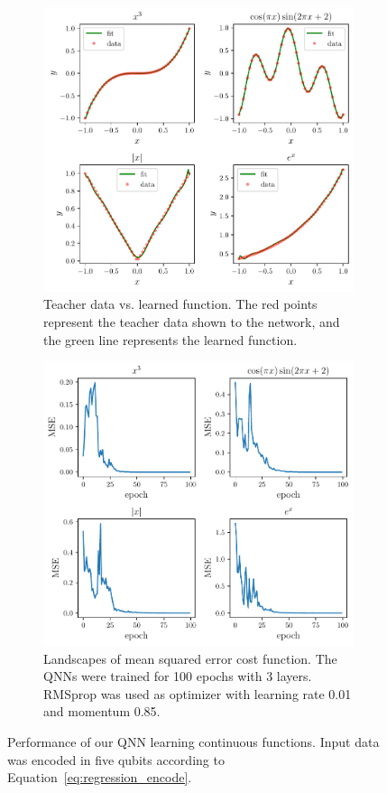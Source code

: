 \documentclass[a4paper,10pt]{article}
\begin{document}
\begin{figure}[ht]
	\centering
	\begin{subfigure}{.4875\textwidth}
		\centering
		\includegraphics[width=1\linewidth]{figures/qnn_regression.pdf}
		\caption{Teacher data vs. learned function. The red points represent the teacher data shown to the network, and the green line represents the learned function.}
	\end{subfigure}
	\hfill
	\begin{subfigure}{.4875\textwidth}
		\centering
		\includegraphics[width=1\linewidth]{figures/qnn_regression_mse.pdf}
		\caption{Landscapes of mean squared error cost function. The QNNs were trained for 100 epochs with 3 layers. RMSprop was used as optimizer with learning rate 0.01 and momentum 0.85.}
	\end{subfigure}
	\caption{Performance of our QNN learning continuous functions. Input data was encoded in five qubits according to Equation~\ref{eq:regression_encode}.}
	\label{fig:qnn_regression_results}
\end{figure}
\end{document}
